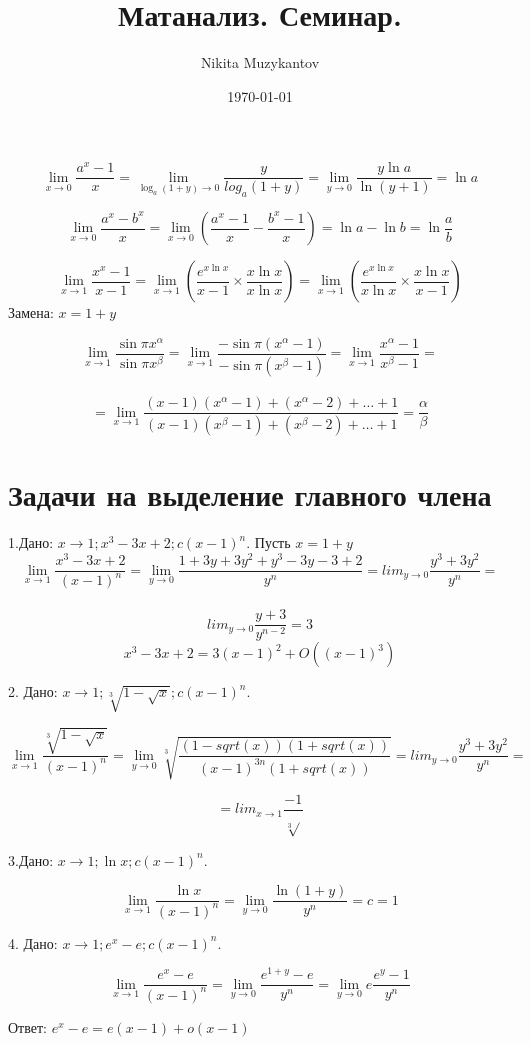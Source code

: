 \documentclass[a4paper,12pt]{article}
\author{Nikita Muzykantov}
\title{Матанализ. Семинар.}
\date{\today}
\begin{document}
\maketitle

\[ \lim_{x\to 0} \frac{a^x-1}{x} = \lim_{\log_a(1+y)\to 0}{\frac{y}{log_a (1+y)}} = \lim_{y\to 0} \frac{y\ln a}{\ln (y+1)} = \ln a
\]

\[ \lim_{x\to 0}\frac{a^x-b^x}{x} = \lim_{x\to 0}\left(\frac{a^x-1}{x}-\frac{b^x-1}{x}\right) = \ln a - \ln b = \ln \frac{a}{b}
\]

\[ \lim_{x\to 1} \frac{x^x-1}{x-1} = \lim_{x\to 1}\left(\frac{e^{x\ln x}}{x-1}\times \frac{x\ln x}{x\ln x}\right) = \lim_{x\to 1}\left(\frac{e^{x\ln x}}{x\ln x}\times \frac{x\ln x}{x-1}\right)
\]
Замена: $x=1+y$ 

\[ \lim_{x\to 1}\frac{\sin{\pi x^\alpha}}{\sin{\pi x^\beta}}=  \lim_{x\to 1}\frac{-\sin{\pi (x^\alpha -1)}}{-\sin{\pi (x^\beta -1)}} =
\lim_{x\to 1}\frac{x^\alpha -1}{x^\beta -1} = \]\\ \[
=\lim_{x\to 1}\frac{(x-1)(x^\alpha -1)+(x^\alpha -2)+\dots+1}{(x-1)(x^\beta -1)+(x^\beta -2)+\dots+1}=\frac{\alpha}{\beta}
\]

\section{Задачи на выделение главного члена}
1.Дано: $x\to 1; x^3-3x+2; c(x-1)^n$. Пусть $x=1+y$
\[ \lim_{x\to 1}\frac{x^3-3x+2}{(x-1)^n}=\lim_{y\to 0}\frac{1+3y+3y^2+y^3-3y-3+2}{y^n} = lim_{y\to 0}\frac{y^3+3y^2}{y^n}=
\]\\
\[lim_{y\to 0} \frac{y+3}{y^{n-2}}=3\]
\[x^3-3x+2=3(x-1)^2+O((x-1)^3)\]


2. Дано: $x\to 1; \sqrt[3]{1-\sqrt{x}}; c(x-1)^n$.

\[ \lim_{x\to 1}\frac{\sqrt[3]{1-\sqrt{x}}}{(x-1)^n}=\lim_{y\to 0}\sqrt[3]{\frac{(1-sqrt(x))(1+sqrt(x))}{(x-1)^{3n}(1+sqrt(x))}} = lim_{y\to 0}\frac{y^3+3y^2}{y^n}=
\]

\[=lim_{x\to 1}\frac{-1}{\sqrt[3]{}}\]


3.Дано: $x\to 1; \ln x; c(x-1)^n$.

\[ \lim_{x\to 1}\frac{\ln x}{(x-1)^n}=\lim_{y\to 0}\frac{\ln(1+y)}{y^n}=c=1
\]


4. Дано: $x\to 1; e^x-e; c(x-1)^n$.

\[ \lim_{x\to 1}\frac{e^x-e}{(x-1)^n}=\lim_{y\to 0}\frac{e^{1+y}-e}{y^n}=\lim_{y\to 0}e\frac{e^y-1}{y^n}\]


Ответ: $e^x-e=e(x-1) + o(x-1)$
\end{document}
